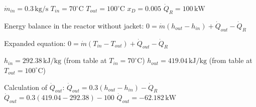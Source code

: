 \( \dot{m}_{in} = 0.3 \, \text{kg/s} \)  
\( T_{in} = 70^\circ \text{C} \)  
\( T_{out} = 100^\circ \text{C} \)  
\( x_D = 0.005 \)  
\( \dot{Q}_R = 100 \, \text{kW} \)  

Energy balance in the reactor without jacket:  
\( 0 = \dot{m} (h_{out} - h_{in}) + \dot{Q}_{out} - \dot{Q}_R \)  

Expanded equation:  
\( 0 = \dot{m} (T_{in} - T_{out}) + \dot{Q}_{out} - \dot{Q}_R \)  

\( h_{in} = 292.38 \, \text{kJ/kg} \) (from table at \( T_{in} = 70^\circ \text{C} \))  
\( h_{out} = 419.04 \, \text{kJ/kg} \) (from table at \( T_{out} = 100^\circ \text{C} \))  

Calculation of \( \dot{Q}_{out} \):  
\( \dot{Q}_{out} = 0.3 (h_{out} - h_{in}) - \dot{Q}_R \)  
\( \dot{Q}_{out} = 0.3 (419.04 - 292.38) - 100 \)  
\( \dot{Q}_{out} = -62.182 \, \text{kW} \)